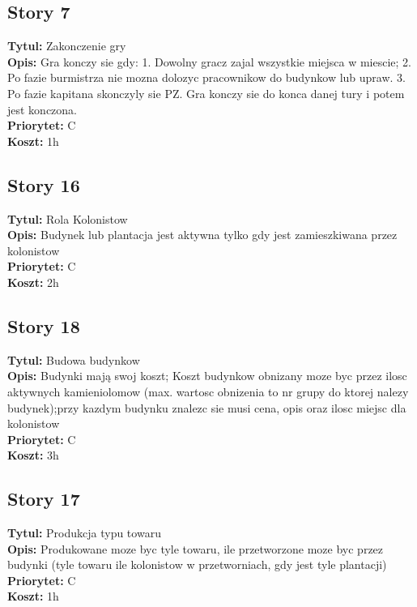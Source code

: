 \documentclass[12pt]{article}
\begin{document}
\subsection{Story 7}
\textbf{Tytul:} Zakonczenie gry \\
\textbf{Opis:} Gra konczy sie gdy: 1. Dowolny gracz zajal wszystkie miejsca w
miescie; 2. Po fazie burmistrza nie mozna dolozyc pracownikow do budynkow lub
upraw. 3. Po fazie kapitana skonczyly sie PZ. Gra konczy sie do konca danej tury
i potem jest konczona. \\
\textbf{Priorytet:} C \\
\textbf{Koszt:} 1h \\

\subsection{Story 16}
\textbf{Tytul:} Rola Kolonistow  \\
\textbf{Opis:} Budynek lub plantacja jest aktywna tylko gdy jest zamieszkiwana
  przez kolonistow \\
\textbf{Priorytet:} C \\
\textbf{Koszt:} 2h \\

\subsection{Story 18 }
\textbf{Tytul:} Budowa budynkow \\
\textbf{Opis:}  Budynki mają swoj koszt; Koszt budynkow obnizany moze byc przez
ilosc aktywnych kamieniolomow (max. wartosc obnizenia to nr grupy do ktorej
nalezy budynek);przy kazdym budynku znalezc sie musi cena, opis oraz ilosc
miejsc dla kolonistow\\
\textbf{Priorytet:} C \\
\textbf{Koszt:} 3h \\

\subsection{Story 17}
\textbf{Tytul:} Produkcja typu towaru \\
\textbf{Opis:} Produkowane moze byc tyle towaru, ile przetworzone moze byc przez
budynki (tyle towaru ile kolonistow w przetworniach, gdy jest tyle plantacji)\\
\textbf{Priorytet:} C \\
\textbf{Koszt:} 1h \\
  
\end{document}
